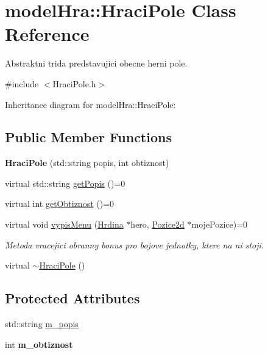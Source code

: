 \hypertarget{classmodel_hra_1_1_hraci_pole}{\section{model\-Hra\-:\-:Hraci\-Pole Class Reference}
\label{classmodel_hra_1_1_hraci_pole}
}


Abstraktni trida predstavujici obecne herni pole.  




{\ttfamily \#include $<$Hraci\-Pole.\-h$>$}



Inheritance diagram for model\-Hra\-:\-:Hraci\-Pole\-:
\subsection*{Public Member Functions}
\begin{DoxyCompactItemize}
\item 
\hypertarget{classmodel_hra_1_1_hraci_pole_a869160bbc1c6a520a2fcbbd8afa0e886}{{\bfseries Hraci\-Pole} (std\-::string popis, int obtiznost)}\label{classmodel_hra_1_1_hraci_pole_a869160bbc1c6a520a2fcbbd8afa0e886}

\item 
virtual std\-::string \hyperlink{classmodel_hra_1_1_hraci_pole_a7477974f668c6e36faa834819ffd648f}{get\-Popis} ()=0
\item 
virtual int \hyperlink{classmodel_hra_1_1_hraci_pole_ad77602e295f86a8ff76a5ce4334876ca}{get\-Obtiznost} ()=0
\item 
virtual void \hyperlink{classmodel_hra_1_1_hraci_pole_a5a5ef6ed997c5235b6ebb5e0c7ef9396}{vypis\-Menu} (\hyperlink{class_hrdina}{Hrdina} $\ast$hero, \hyperlink{struct_pozice2d}{Pozice2d} $\ast$moje\-Pozice)=0
\begin{DoxyCompactList}\small\item\em Metoda vracejici obranny bonus pro bojove jednotky, ktere na ni stoji. \end{DoxyCompactList}\item 
virtual \hyperlink{classmodel_hra_1_1_hraci_pole_a6f9741160812d65a5de61fb7a0fc6cbe}{$\sim$\-Hraci\-Pole} ()
\end{DoxyCompactItemize}
\subsection*{Protected Attributes}
\begin{DoxyCompactItemize}
\item 
std\-::string \hyperlink{classmodel_hra_1_1_hraci_pole_a6e86c5af171a2f94c46f8523ffc228aa}{m\-\_\-popis}
\item 
\hypertarget{classmodel_hra_1_1_hraci_pole_aa07209c5b59ec5d6cede5eb272af8717}{int {\bfseries m\-\_\-obtiznost}}\label{classmodel_hra_1_1_hraci_pole_aa07209c5b59ec5d6cede5eb272af8717}

\end{DoxyCompactItemize}


